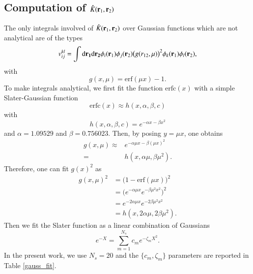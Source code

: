 \documentclass[aip,jcp,reprint,noshowkeys,superscriptaddress]{revtex4-1}
\newcommand{\bri}[1]{{\bf r}_{#1}}
\newcommand{\dr}[1]{\text{d}{\bf r_{#1}}}
\begin{document}
\subsection{Computation of $\hat{K}(\bri{1},\bri{2})$} 
\label{sec:integrals}
The only integrals involved of $\hat{K}(\bri{1},\bri{2})$ over Gaussian functions which are not analytical are of the types 
\begin{equation}
 \label{eq:k_ijkl}
 v_{ij}^{kl} = \int \dr{1} \dr{2} \phi_i(\bri{1}) \phi_j(\bri{2}) \big( g(r_{12},\mu) \big)^2  \phi_k(\bri{1}) \phi_l(\bri{2}),  
\end{equation}
with 
\begin{equation}
 g(x, \mu)= \text{erf}( \mu x) - 1.
\end{equation}
To make integrals analytical, we first fit the function $\text{erfc}(x)$ with a simple Slater-Gaussian function 
\begin{equation}
 \text{erfc}(x) \approx h(x,\alpha,\beta,c)
\end{equation}
with 
\begin{equation}
 h(x,\alpha,\beta,c) = e^{-\alpha x - \beta x^2}
\end{equation}
and $\alpha=1.09529$ and $\beta = 0.756023$. 
Then, by posing $y=\mu x$, one obtains 
\begin{equation}
 \label{fit_erf}
 \begin{aligned}
  g(x,\mu)  \approx & e^{-\alpha \mu x - \beta (\mu x)^2}\\ 
        =& h(x,\alpha \mu, \beta \mu^2).
 \end{aligned}
\end{equation}
Therefore, one can fit $g(x)^2$ as 
\begin{equation}
 \begin{aligned}
 g(x,\mu)^2&= \bigg( 1 - \text{erf}(\mu x) \bigg)^2\\
           &= \bigg( e^{-\alpha \mu x } e^{-\beta \mu^2 x^2}\bigg)^2 \\
           &= e^{-2\alpha  \mu x } e^{-2 \beta \mu^2 x^2} \\
           &= h(x,2 \alpha \mu, 2 \beta \mu^2).
 \end{aligned}
\end{equation}
Then we fit the Slater function as a linear combination of Gaussians 
\begin{equation}
 e^{-X} = \sum_{m=1}^{N_s} c_m e^{-\zeta_m X^2}. 
\end{equation}
In the present work, we use $N_s=20$ and the $\{c_m,\zeta_m\}$ parameters are reported in Table \ref{gauss_fit}.
\end{document}
